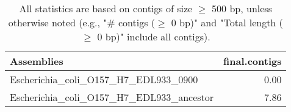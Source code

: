\documentclass[12pt,a4paper]{article}
\begin{document}
\begin{table}[ht]
\begin{center}
\caption{All statistics are based on contigs of size $\geq$ 500 bp, unless otherwise noted (e.g., "\# contigs ($\geq$ 0 bp)" and "Total length ($\geq$ 0 bp)" include all contigs).}
\begin{tabular}{|l*{1}{|r}|}
\hline
Assemblies & final.contigs \\ \hline
Escherichia\_coli\_O157\_H7\_EDL933\_0900 & 0.00 \\ \hline
Escherichia\_coli\_O157\_H7\_EDL933\_ancestor & 7.86 \\ \hline
\end{tabular}
\end{center}
\end{table}
\end{document}
